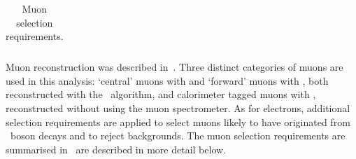 \begin{table}[]
\begin{tabular}{ l  l l }
%
    \hline \hline
  \end{tabular}
   \caption{Muon selection requirements.}
   \label{table:objsel-mu}
\end{table}

Muon reconstruction was described in~. Three distinct categories of
muons are used in this analysis: `central' muons with  and
`forward' muons with , both reconstructed with the
\staco\ algorithm, and calorimeter tagged muons with ,
reconstructed without using the muon spectrometer. As for electrons, additional
selection requirements are applied to select muons likely to have originated from
\Z\ boson decays and to reject backgrounds. The muon selection requirements are
summarised in~ are described in more detail below. 

